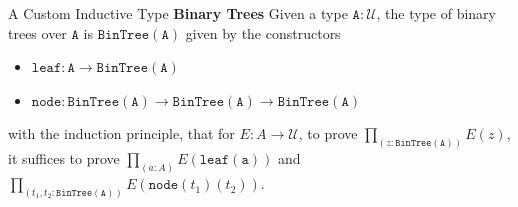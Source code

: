 \documentclass[10pt, aspectratio=169]{beamer}
\newcommand{\U}{\mathcal{U}}
\newcommand{\Prod}[2]{\prod_{(#1)}{#2}}
\newcommand{\W}[2]{W_{(#1)}{#2}}
\newcommand{\0}{\mathbf{0}}
\newcommand{\1}{\mathbf{1}}
\newcommand{\2}{\mathbf{2}}
\newcommand{\ind}{\mathbf{ind}}
\begin{document}
%


\begin{frame}{A Custom Inductive Type}
  \textbf{Binary Trees}
  Given a type $\mathtt{A} : \U$, the type of binary trees over $\mathtt{A}$ is $\mathtt{BinTree(A)}$ given by the constructors
  \begin{itemize}
  \item $\mathtt{leaf} : \mathtt{A} \to \mathtt{BinTree(A)}$
  \item $\mathtt{node} : \mathtt{BinTree(A)} \to \mathtt{BinTree(A)} \to \mathtt{BinTree(A)}$
  \end{itemize}
  with the induction principle, that for $E : A \to \U$, to prove $\Prod{z : \mathtt{BinTree(A)}}{E(z)}$,
  it suffices to prove $\Prod{a : A}{E(\mathtt{leaf(a)})}$ and $\Prod{t_1, t_2 : \mathtt{BinTree(A)}}{E(\mathtt{node}(t_1)(t_2))}.$
\end{frame}
\end{document}
